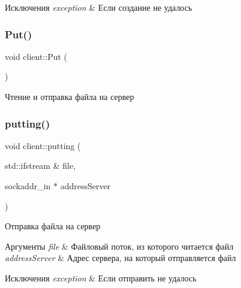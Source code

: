 \begin{DoxyExceptions}{Исключения}
{\em exception} & Если создание не удалось \\
\hline
\end{DoxyExceptions}
\mbox{\label{classclient_a79b042ca6412a9dbe2aa6fc7e2c84fd6}} 
\subsubsection{\texorpdfstring{Put()}{Put()}}
{\footnotesize\ttfamily void client\+::\+Put (\begin{DoxyParamCaption}{ }\end{DoxyParamCaption})}



Чтение и отправка файла на сервер 

\mbox{\label{classclient_a9402ed1d26625f9e65f8d724810511be}} 
\subsubsection{\texorpdfstring{putting()}{putting()}}
{\footnotesize\ttfamily void client\+::putting (\begin{DoxyParamCaption}\item[{std\+::ifstream \&}]{file,  }\item[{sockaddr\+\_\+in $\ast$}]{address\+Server }\end{DoxyParamCaption})\hspace{0.3cm}{\ttfamily [private]}}



Отправка файла на сервер 


\begin{DoxyParams}{Аргументы}
{\em file} & Файловый поток, из которого читается файл \\
\hline
{\em address\+Server} & Адрес сервера, на который отправляется файл \\
\hline
\end{DoxyParams}

\begin{DoxyExceptions}{Исключения}
{\em exception} & Если отправить не удалось \\
\hline
\end{DoxyExceptions}


